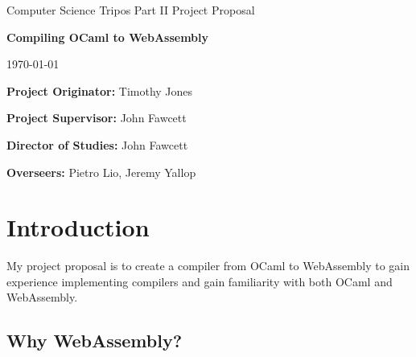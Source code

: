 \documentclass[a4paper,12pt]{article}
\begin{document}
\medskip
{}
\medskip
{}

\vfil

\centerline{\large Computer Science Tripos Part II Project Proposal}
\vspace{0.4in}
\centerline{\Large \textbf{Compiling OCaml to WebAssembly}}
\vspace{0.3in}
\centerline{\large \today}

\vfil

\textbf{Project Originator:} Timothy Jones

\vspace{0.5in}

\textbf{Project Supervisor:} John Fawcett

\vspace{0.2in}

\iffalse
{\bf Signature:}
\fi

\vspace{0.5in}

{\bf Director of Studies:} John Fawcett

\vspace{0.2in}

\iffalse
{\bf Signature:}
\fi

\vspace{0.5in}

{\bf Overseers:} Pietro Lio, Jeremy Yallop

\vspace{0.2in}

\iffalse
{\bf Signatures:}
\fi

\vfil

\eject

\section{Introduction}

My project proposal is to create a compiler from OCaml to WebAssembly to gain experience implementing compilers and gain familiarity with both OCaml and WebAssembly.

\subsection{Why WebAssembly?}
\end{document}
